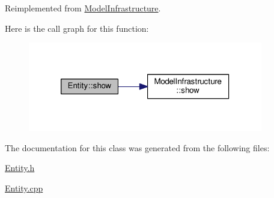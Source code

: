 Reimplemented from \hyperlink{class_model_infrastructure_a649a5a89a0c9931783d3c51de2acf266}{Model\-Infrastructure}.



Here is the call graph for this function\-:\nopagebreak
\begin{figure}[H]
\begin{center}
\leavevmode
\includegraphics[width=290pt]{class_entity_a86cc324050b451b31b134943e7978e36_cgraph}
\end{center}
\end{figure}




The documentation for this class was generated from the following files\-:\begin{DoxyCompactItemize}
\item 
\hyperlink{_entity_8h}{Entity.\-h}\item 
\hyperlink{_entity_8cpp}{Entity.\-cpp}\end{DoxyCompactItemize}
